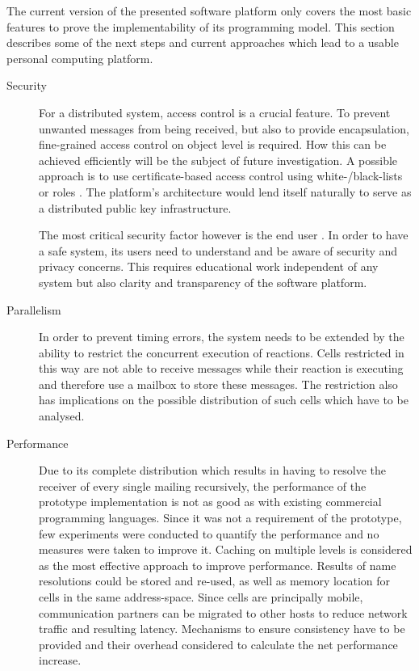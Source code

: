 The current version of the presented software platform only covers the most basic features to prove the implementability of its programming model. This section describes some of the next steps and current approaches which lead to a usable personal computing platform.

\begin{description}

\item[Security]

For a distributed system, access control is a crucial feature. To prevent unwanted messages from being received, but also to provide encapsulation, fine-grained access control on object level is required. How this can be achieved efficiently will be the subject of future investigation. A possible approach is to use certificate-based access control \cite{CertificateAccess} using white-/black-lists or roles \cite{CertificationRoles}. The platform's architecture would lend itself naturally to serve as a distributed public key infrastructure.

The most critical security factor however is the end user \cite{SecurityAwareness}. In order to have a safe system, its users need to understand and be aware of security and privacy concerns. This requires educational work independent of any system but also clarity and transparency of the software platform.

\item[Parallelism]

In order to prevent timing errors, the system needs to be extended by the ability to restrict the concurrent execution of reactions. Cells restricted in this way are not able to receive messages while their reaction is executing and therefore use a mailbox to store these messages. The restriction also has implications on the possible distribution of such cells which have to be analysed. 

\item[Performance]

Due to its complete distribution which results in having to resolve the receiver of every single mailing recursively, the performance of the prototype implementation is not as good as with existing commercial programming languages. Since it was not a requirement of the prototype, few experiments were conducted to quantify the performance and no measures were taken to improve it. Caching on multiple levels is considered as the most effective approach to improve performance. Results of name resolutions could be stored and re-used, as well as memory location for cells in the same address-space. Since cells are principally mobile, communication partners can be migrated to other hosts to reduce network traffic and resulting latency. Mechanisms to ensure consistency have to be provided and their overhead considered to calculate the net performance increase.


\end{description}
